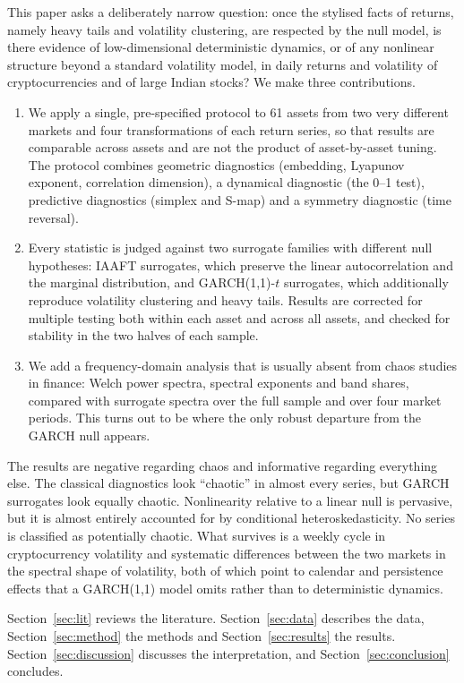 \documentclass[11pt,a4paper]{article}
\begin{document}
This paper asks a deliberately narrow question: once the stylised facts of returns, namely heavy tails and
volatility clustering, are respected by the null model, is there evidence of low-dimensional deterministic
dynamics, or of any nonlinear structure beyond a standard volatility model, in daily returns and volatility of
cryptocurrencies and of large Indian stocks? We make three contributions.
\begin{enumerate}
\item We apply a single, pre-specified protocol to 61 assets from two very different markets and four
transformations of each return series, so that results are comparable across assets and are not the product of
asset-by-asset tuning. The protocol combines geometric diagnostics (embedding, Lyapunov exponent, correlation
dimension), a dynamical diagnostic (the 0--1 test), predictive diagnostics (simplex and S-map) and a symmetry
diagnostic (time reversal).
\item Every statistic is judged against two surrogate families with different null hypotheses: IAAFT surrogates,
which preserve the linear autocorrelation and the marginal distribution, and GARCH(1,1)-$t$ surrogates, which
additionally reproduce volatility clustering and heavy tails. Results are corrected for multiple testing both
within each asset and across all assets, and checked for stability in the two halves of each sample.
\item We add a frequency-domain analysis that is usually absent from chaos studies in finance: Welch power
spectra, spectral exponents and band shares, compared with surrogate spectra over the full sample and over four
market periods. This turns out to be where the only robust departure from the GARCH null appears.
\end{enumerate}

The results are negative regarding chaos and informative regarding everything else. The classical diagnostics
look ``chaotic'' in almost every series, but GARCH surrogates look equally chaotic. Nonlinearity relative to a
linear null is pervasive, but it is almost entirely accounted for by conditional heteroskedasticity. No series is
classified as potentially chaotic. What survives is a weekly cycle in cryptocurrency volatility and systematic
differences between the two markets in the spectral shape of volatility, both of which point to calendar and
persistence effects that a GARCH(1,1) model omits rather than to deterministic dynamics.

Section~\ref{sec:lit} reviews the literature. Section~\ref{sec:data} describes the data,
Section~\ref{sec:method} the methods and Section~\ref{sec:results} the results. Section~\ref{sec:discussion}
discusses the interpretation, and Section~\ref{sec:conclusion} concludes.
\end{document}
